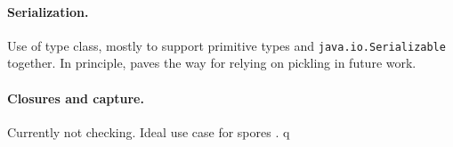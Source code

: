 \paragraph{Serialization.}
Use of type class, mostly to support primitive types and
\lstinline{java.io.Serializable} together. In principle, paves the way for
relying on pickling \cite{MillerETAL13InstantPicklesGeneratingObjectorientedPicklerCombinators} in future work.

\paragraph{Closures and capture.} Currently not checking. Ideal use case for spores \cite{MillerHallerOdersky14SporesTypebasedFoundationClosuresAgeConcurrency}.
q